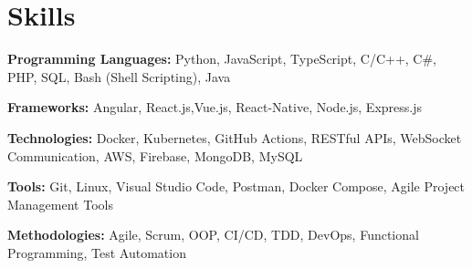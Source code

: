 \section{Skills}
\vspace{2pt}
\resumeSubHeadingListStart
\small{\item{

                  \textbf{Programming Languages:}{ Python, JavaScript, TypeScript, C/C++, C\#, PHP, SQL, Bash (Shell Scripting), Java} \\ \vspace{3pt}

                  \textbf{Frameworks:}{ Angular, React.js,Vue.js, React-Native, Node.js, Express.js} \\ \vspace{3pt}

                  \textbf{Technologies:}{ Docker, Kubernetes, GitHub Actions, RESTful APIs, WebSocket Communication, AWS, Firebase, MongoDB, MySQL} \\ \vspace{3pt}

                  \textbf{Tools:}{ Git, Linux, Visual Studio Code, Postman, Docker Compose, Agile Project Management Tools} \\ \vspace{3pt}

                  \textbf{Methodologies:}{ Agile, Scrum, OOP, CI/CD, TDD, DevOps, Functional Programming, Test Automation} \\ \vspace{3pt}

            }}
\resumeSubHeadingListEnd
